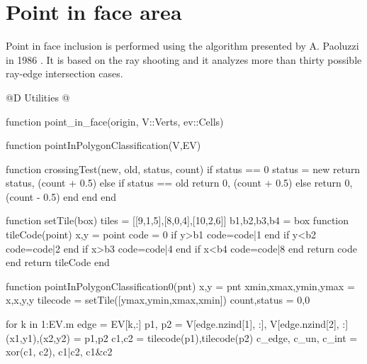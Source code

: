 \section{Point in face area}
\label{sec:point_in_face}

Point in face inclusion is performed using the algorithm
presented by A. Paoluzzi in 1986 \cite{Paoluzzi-ART1986}.
It is based on the ray shooting and it analyzes more than
thirty possible ray-edge intersection cases.

@D Utilities
@{function point_in_face(origin, V::Verts, ev::Cells)

    function pointInPolygonClassification(V,EV)

        function crossingTest(new, old, status, count)
        if status == 0
            status = new
            return status, (count + 0.5)
        else
            if status == old
                return 0, (count + 0.5)
            else
                return 0, (count - 0.5)
            end
        end
        end

        function setTile(box)
        tiles = [[9,1,5],[8,0,4],[10,2,6]]
        b1,b2,b3,b4 = box
        function tileCode(point)
            x,y = point
            code = 0
            if y>b1 code=code|1 end
            if y<b2 code=code|2 end
            if x>b3 code=code|4 end
            if x<b4 code=code|8 end
            return code
        end
        return tileCode
        end

        function pointInPolygonClassification0(pnt)
            x,y = pnt
            xmin,xmax,ymin,ymax = x,x,y,y
            tilecode = setTile([ymax,ymin,xmax,xmin])
            count,status = 0,0

            for k in 1:EV.m
                edge = EV[k,:]
                p1, p2 = V[edge.nzind[1], :], V[edge.nzind[2], :]
                (x1,y1),(x2,y2) = p1,p2
                c1,c2 = tilecode(p1),tilecode(p2)
                c_edge, c_un, c_int = xor(c1, c2), c1|c2, c1&c2
                
}
